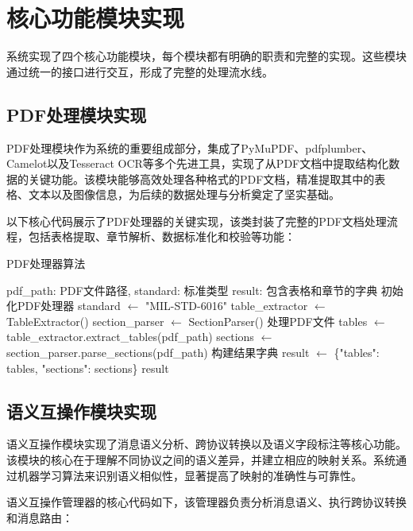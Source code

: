 \section{核心功能模块实现}

系统实现了四个核心功能模块，每个模块都有明确的职责和完整的实现。这些模块通过统一的接口进行交互，形成了完整的处理流水线。

\subsection{PDF处理模块实现}

PDF处理模块作为系统的重要组成部分，集成了PyMuPDF、pdfplumber、Camelot以及Tesseract OCR等多个先进工具，实现了从PDF文档中提取结构化数据的关键功能。该模块能够高效处理各种格式的PDF文档，精准提取其中的表格、文本以及图像信息，为后续的数据处理与分析奠定了坚实基础。

以下核心代码展示了PDF处理器的关键实现，该类封装了完整的PDF文档处理流程，包括表格提取、章节解析、数据标准化和校验等功能：

\begin{algorithm}[H]
\caption{PDF处理器算法}
\begin{algorithmic}[1]
\REQUIRE pdf\_path: PDF文件路径, standard: 标准类型
\ENSURE result: 包含表格和章节的字典
\STATE 初始化PDF处理器
\STATE standard $\leftarrow$ "MIL-STD-6016"
\STATE table\_extractor $\leftarrow$ TableExtractor()
\STATE section\_parser $\leftarrow$ SectionParser()
\STATE 处理PDF文件
\STATE tables $\leftarrow$ table\_extractor.extract\_tables(pdf\_path)
\STATE sections $\leftarrow$ section\_parser.parse\_sections(pdf\_path)
\STATE 构建结果字典
\STATE result $\leftarrow$ \{"tables": tables, "sections": sections\}
\RETURN result
\end{algorithmic}
\end{algorithm}

\subsection{语义互操作模块实现}

语义互操作模块实现了消息语义分析、跨协议转换以及语义字段标注等核心功能。该模块的核心在于理解不同协议之间的语义差异，并建立相应的映射关系。系统通过机器学习算法来识别语义相似性，显著提高了映射的准确性与可靠性。

语义互操作管理器的核心代码如下，该管理器负责分析消息语义、执行跨协议转换和消息路由：

